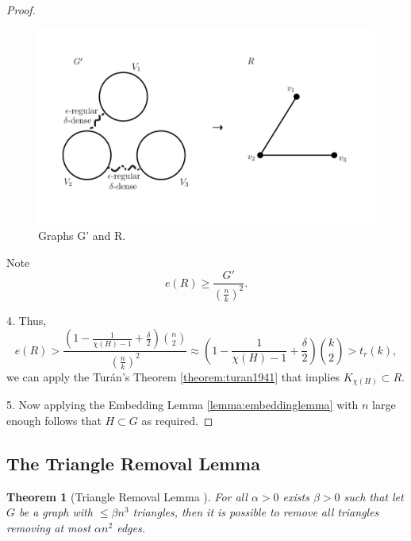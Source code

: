 \documentclass[12pt,twoside,a4paper]{book}
\numberwithin{equation}{section}
\newtheorem{theorem}             {Theorem}[section]
\theoremstyle{remark}
\begin{document}
\begin{proof}
\begin{figure}[H]
     \centering
     \includegraphics[scale=1.5]{Figuras/graph-G'-and-R.jpg}
     \caption{Graphs G' and R.}
     \label{fig:graph-G'-and-R}
\end{figure}

Note 
$$e(R) \geq \frac{G'}{\left(\frac{n}{k}\right)^2}.$$

4. Thus,
$$e(R) > \frac{\left(1 - \frac{1}{\chi(H) - 1} + \frac{\delta}{2}\right) \binom{n}{2}}{\left(\frac{n}{k}\right)^2} \approx \left( 1 - \frac{1}{\chi(H) - 1} + \frac{\delta}{2}\right) \binom{k}{2}> t_r(k),$$
we can apply the Turán's Theorem \ref{theorem:turan1941} that implies $K_{\chi (H)} \subset R$.

5. Now applying the Embedding Lemma \ref{lemma:embeddinglemma} with $n$ large enough follows that $H \subset G$ as required.

\end{proof}

\subsection{The Triangle Removal Lemma}
\begin{theorem}[{Triangle Removal Lemma \cite{RuSz76}}]
For all $\alpha > 0$ exists $\beta > 0$ such that let $G$ be a graph with $\leq \beta n^3$ triangles, then it is possible to remove all triangles removing at most $\alpha n^2$ edges. 
\end{theorem}
\end{document}
